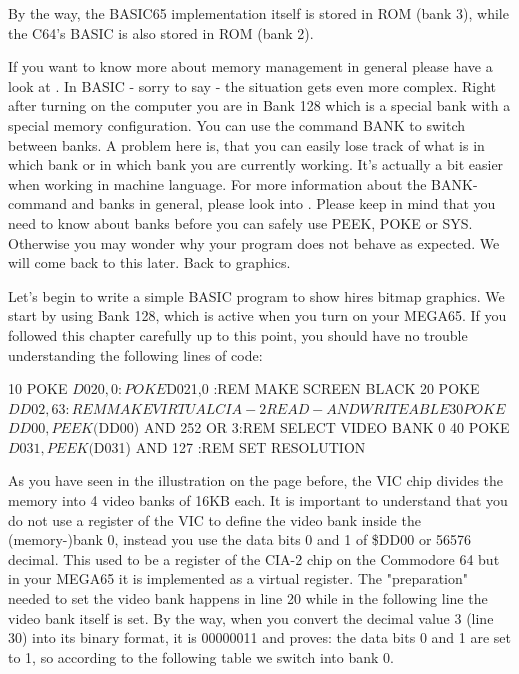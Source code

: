 By the way, the BASIC65 implementation itself is stored in ROM (bank 3), while the C64's BASIC is also stored in ROM (bank 2).

If you want to know more about memory management in general please have a look at . In BASIC - sorry to say - the situation gets even more complex. Right after turning on the computer you are in Bank 128 which is a special bank with a special memory configuration. You can use the command BANK to switch between banks. A problem here is, that you can easily lose track of what is in which bank or in which bank you are currently working. It's actually a bit easier when working in machine language. For more information about the BANK-command and banks in general, please look into . Please keep in mind that you need to know about banks before you can safely use PEEK, POKE or SYS. Otherwise you may wonder why your program does not behave as expected. We will come back to this later. Back to graphics. 

Let's begin to write a simple BASIC program to show hires bitmap graphics. We start by using Bank 128, which is active when you turn on your MEGA65. If you followed this chapter carefully up to this point, you should have no trouble understanding the following lines of code:

\begin{screenoutput}
10 POKE $D020,0 : POKE $D021,0          :REM MAKE SCREEN BLACK
20 POKE $DD02, 63                       :REM MAKE VIRTUAL CIA-2 READ- AND WRITEABLE 
30 POKE $$DD00, PEEK($DD00) AND 252 OR 3:REM SELECT VIDEO BANK 0
40 POKE $D031, PEEK($D031) AND 127      :REM SET RESOLUTION
\end{screenoutput}

As you have seen in the illustration on the page before, the VIC chip divides the memory into 4 video banks of 16KB each.
 It is important to understand that you do not use a register of the VIC to define the video bank inside 
 the (memory-)bank 0, instead you use the data bits 0 and 1 of \$DD00 or 56576 decimal. 
 This used to be a register of the CIA-2 chip on the Commodore 64 but in your MEGA65 it is implemented as a 
 virtual register. The "preparation" needed to set the video bank happens in line 20 while in the following line 
 the video bank itself is set. By the way, when you convert the decimal value 3 (line 30) into its binary format, 
 it is 00000011 and proves: the data bits 0 and 1 are set to 1, so according to the following table we switch into bank 0.

